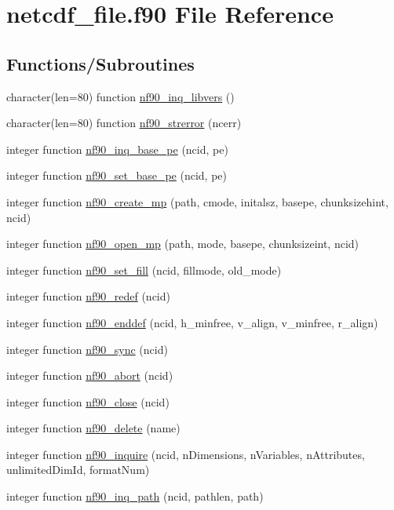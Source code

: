 \hypertarget{netcdf__file_8f90}{}\section{netcdf\+\_\+file.\+f90 File Reference}
\label{netcdf__file_8f90}
\subsection*{Functions/\+Subroutines}
\begin{DoxyCompactItemize}
\item 
character(len=80) function \hyperlink{netcdf__file_8f90_ad94c17f0f0468c40a76d919695e264bf}{nf90\+\_\+inq\+\_\+libvers} ()
\item 
character(len=80) function \hyperlink{netcdf__file_8f90_aa6681acb041e6d3ae5c83c1646039729}{nf90\+\_\+strerror} (ncerr)
\item 
integer function \hyperlink{netcdf__file_8f90_a3312742f3f4f3beeb13f3cda85229298}{nf90\+\_\+inq\+\_\+base\+\_\+pe} (ncid, pe)
\item 
integer function \hyperlink{netcdf__file_8f90_afd3d1288b0bff0c6d7efc465935f981b}{nf90\+\_\+set\+\_\+base\+\_\+pe} (ncid, pe)
\item 
integer function \hyperlink{netcdf__file_8f90_a52b7705229d04e51dd782c6bdc5e7aad}{nf90\+\_\+create\+\_\+mp} (path, cmode, initalsz, basepe, chunksizehint, ncid)
\item 
integer function \hyperlink{netcdf__file_8f90_a6d4993d0bc8de0c617071f6527f7dedf}{nf90\+\_\+open\+\_\+mp} (path, mode, basepe, chunksizeint, ncid)
\item 
integer function \hyperlink{netcdf__file_8f90_a5857d0f422d90038aa5a748893f0d7fc}{nf90\+\_\+set\+\_\+fill} (ncid, fillmode, old\+\_\+mode)
\item 
integer function \hyperlink{netcdf__file_8f90_ae3b9855ad30a9b042a7211ca0eb7eb3b}{nf90\+\_\+redef} (ncid)
\item 
integer function \hyperlink{netcdf__file_8f90_a76e8ac5f28d4098c6e8a79edae2879c7}{nf90\+\_\+enddef} (ncid, h\+\_\+minfree, v\+\_\+align, v\+\_\+minfree, r\+\_\+align)
\item 
integer function \hyperlink{netcdf__file_8f90_a033641c2ed47b960ec72f0606b848c74}{nf90\+\_\+sync} (ncid)
\item 
integer function \hyperlink{netcdf__file_8f90_a8ddf15ef17bbc5ef354b36af29b25767}{nf90\+\_\+abort} (ncid)
\item 
integer function \hyperlink{netcdf__file_8f90_afea3d4176b7ecfdce13fe3ba08a59a2c}{nf90\+\_\+close} (ncid)
\item 
integer function \hyperlink{netcdf__file_8f90_a98182625d66975384a518ce43f3a3f5f}{nf90\+\_\+delete} (name)
\item 
integer function \hyperlink{netcdf__file_8f90_a60932835dd9715d8f50025ed2ff40fec}{nf90\+\_\+inquire} (ncid, n\+Dimensions, n\+Variables, n\+Attributes, unlimited\+Dim\+Id, format\+Num)
\item 
integer function \hyperlink{netcdf__file_8f90_a20c77c8b0e9009b480ea0e8cf314c23f}{nf90\+\_\+inq\+\_\+path} (ncid, pathlen, path)
\end{DoxyCompactItemize}


